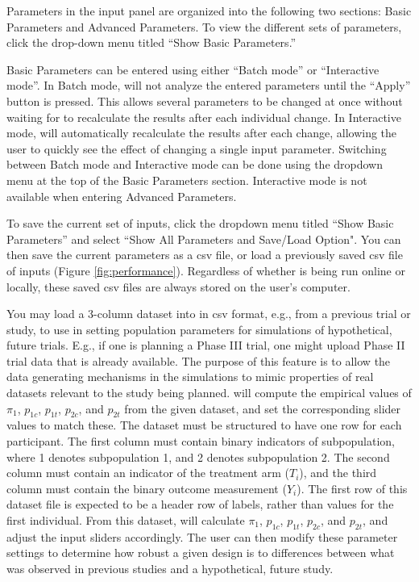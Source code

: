 \documentclass[article]{jss}
\begin{document}
Parameters in the input panel are organized into the following two sections: Basic Parameters and Advanced Parameters. To view the different sets of parameters, click the drop-down menu titled ``Show Basic Parameters.'' 

Basic Parameters can be entered using either ``Batch mode'' or ``Interactive mode''. In Batch mode,  will not analyze the entered parameters until the ``Apply'' button is pressed. This allows several parameters to be changed at once without waiting for  to recalculate the results after each individual change. In Interactive mode,  will automatically recalculate the results after each change, allowing the user to quickly see the effect of changing a single input parameter. Switching between Batch mode and Interactive mode can be done using the dropdown menu at the top of the Basic Parameters section. Interactive mode is not available when entering Advanced Parameters.

To save the current set of inputs, click the dropdown menu titled ``Show Basic Parameters'' and select ``Show All Parameters and Save/Load Option". You can then save the current parameters as a csv file, or load a previously saved csv file of inputs (Figure \ref{fig:performance}). Regardless of whether  is being run online or locally, these saved csv files are always stored on the user's computer. 

You may load a 3-column dataset into  in csv format, e.g., from a previous trial or study, to use in setting population parameters for simulations of hypothetical, future trials. E.g., if one is planning a Phase III trial, one might upload Phase II trial data that is already available. 
The purpose of this feature is to allow the data generating mechanisms in the  simulations to mimic properties of real datasets relevant to the study being planned.
will compute the empirical values of 
$π_1$, $p_{1c}$, $p_{1t}$, $p_{2c}$, and $p_{2t}$ from the given dataset, and set the corresponding slider values to match these.
The dataset must be structured to have one row for each participant. The first column must contain binary indicators of subpopulation, where 1 denotes subpopulation 1, and 2 denotes subpopulation 2. The second column must contain an indicator of the treatment arm ($T_i$), and the third column must contain the binary outcome measurement ($Y_i$). The first row of this dataset file is expected to be a header row of labels, rather than values for the first individual. From this dataset,  will calculate $π_1$, $p_{1c}$, $p_{1t}$, $p_{2c}$, and $p_{2t}$, and adjust the input sliders accordingly.
The user can then modify these parameter settings to determine how robust a given design is to differences between what was observed in previous studies and a hypothetical, future study.
\end{document}
